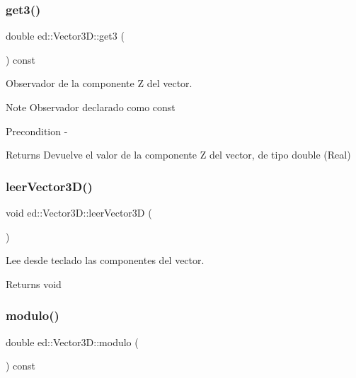 \subsubsection{\texorpdfstring{get3()}{get3()}}
{\footnotesize\ttfamily double ed\+::\+Vector3\+D\+::get3 (\begin{DoxyParamCaption}{ }\end{DoxyParamCaption}) const}



Observador de la componente Z del vector. 

\begin{DoxyNote}{Note}
Observador declarado como const
\end{DoxyNote}
\begin{DoxyPrecond}{Precondition}
-\/
\end{DoxyPrecond}
\begin{DoxyReturn}{Returns}
Devuelve el valor de la componente Z del vector, de tipo double (Real) 
\end{DoxyReturn}
\mbox{\label{classed_1_1Vector3D_a383b32d61696badf77dac30aca5211a3}} 
\subsubsection{\texorpdfstring{leer\+Vector3\+D()}{leerVector3D()}}
{\footnotesize\ttfamily void ed\+::\+Vector3\+D\+::leer\+Vector3D (\begin{DoxyParamCaption}{ }\end{DoxyParamCaption})}



Lee desde teclado las componentes del vector. 

\begin{DoxyReturn}{Returns}
void 
\end{DoxyReturn}
\mbox{\label{classed_1_1Vector3D_a9db1b9e9d7634efeb88f60130283bc9a}} 
\subsubsection{\texorpdfstring{modulo()}{modulo()}}
{\footnotesize\ttfamily double ed\+::\+Vector3\+D\+::modulo (\begin{DoxyParamCaption}{ }\end{DoxyParamCaption}) const}



